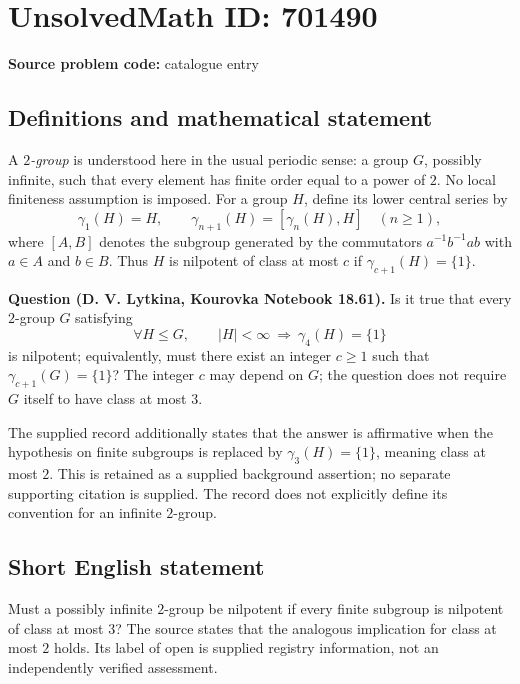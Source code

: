 \documentclass[11pt]{article}
\begin{document}
\section*{UnsolvedMath ID: 701490}
\textbf{Source problem code:} catalogue entry
\subsection{Definitions and mathematical statement}
A \emph{\(2\)-group} is understood here in the usual periodic sense: a group \(G\), possibly infinite, such that every element has finite order equal to a power of \(2\). No local finiteness assumption is imposed. For a group \(H\), define its lower central series by
\[
\gamma_1(H)=H,\qquad \gamma_{n+1}(H)=[\gamma_n(H),H]\quad(n\geq 1),
\]
where \([A,B]\) denotes the subgroup generated by the commutators \(a^{-1}b^{-1}ab\) with \(a\in A\) and \(b\in B\). Thus \(H\) is nilpotent of class at most \(c\) if \(\gamma_{c+1}(H)=\{1\}\).

\textbf{Question (D. V. Lytkina, Kourovka Notebook 18.61).} Is it true that every \(2\)-group \(G\) satisfying
\[
\forall H\leq G,\qquad |H|<\infty\ \Longrightarrow\ \gamma_4(H)=\{1\}
\]
is nilpotent; equivalently, must there exist an integer \(c\geq 1\) such that \(\gamma_{c+1}(G)=\{1\}\)? The integer \(c\) may depend on \(G\); the question does not require \(G\) itself to have class at most \(3\).

The supplied record additionally states that the answer is affirmative when the hypothesis on finite subgroups is replaced by \(\gamma_3(H)=\{1\}\), meaning class at most \(2\). This is retained as a supplied background assertion; no separate supporting citation is supplied. The record does not explicitly define its convention for an infinite \(2\)-group.
\subsection{Short English statement}
Must a possibly infinite \(2\)-group be nilpotent if every finite subgroup is nilpotent of class at most \(3\)? The source states that the analogous implication for class at most \(2\) holds. Its label of open is supplied registry information, not an independently verified assessment.
\end{document}
